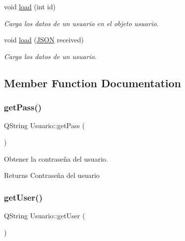 \begin{DoxyCompactItemize}
void \mbox{\hyperlink{classUsuario_a582cfc5fb035575f66240d1784c50632}{load}} (int id)
\begin{DoxyCompactList}\small\item\em Carga los datos de un usuario en el objeto usuario. \end{DoxyCompactList}\item 
void \mbox{\hyperlink{classUsuario_ae1167727130e5f8fb07fad0d7c179c41}{load}} (\mbox{\hyperlink{jugador_8h_ab6104b89642419db4e355b7b2e40abbe}{J\+S\+ON}} received)
\begin{DoxyCompactList}\small\item\em Carga los datos de un usuario. \end{DoxyCompactList}\end{DoxyCompactItemize}


\subsection{Member Function Documentation}
\mbox{\label{classUsuario_ae00ae9ee09459165c7b7ecb060ff7071}} 
\subsubsection{\texorpdfstring{get\+Pass()}{getPass()}}
{\footnotesize\ttfamily Q\+String Usuario\+::get\+Pass (\begin{DoxyParamCaption}{ }\end{DoxyParamCaption})}



Obtener la contraseña del usuario. 

\begin{DoxyReturn}{Returns}
Contraseña del usuario 
\end{DoxyReturn}
\mbox{\label{classUsuario_a26932183472124e9054d95c534e6f7e9}} 
\subsubsection{\texorpdfstring{get\+User()}{getUser()}}
{\footnotesize\ttfamily Q\+String Usuario\+::get\+User (\begin{DoxyParamCaption}{ }\end{DoxyParamCaption})}



